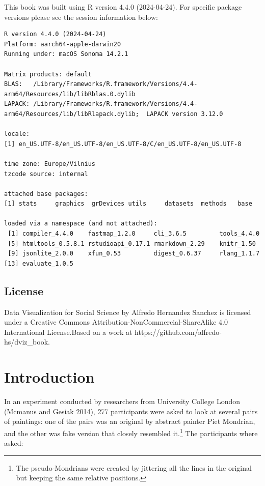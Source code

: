 \documentclass[
  letterpaper,
  DIV=11,
  numbers=noendperiod]{scrreprt}
\begin{document}

This book was built using R version 4.4.0 (2024-04-24). For specific
package versions please see the session information below:

\begin{verbatim}
R version 4.4.0 (2024-04-24)
Platform: aarch64-apple-darwin20
Running under: macOS Sonoma 14.2.1

Matrix products: default
BLAS:   /Library/Frameworks/R.framework/Versions/4.4-arm64/Resources/lib/libRblas.0.dylib 
LAPACK: /Library/Frameworks/R.framework/Versions/4.4-arm64/Resources/lib/libRlapack.dylib;  LAPACK version 3.12.0

locale:
[1] en_US.UTF-8/en_US.UTF-8/en_US.UTF-8/C/en_US.UTF-8/en_US.UTF-8

time zone: Europe/Vilnius
tzcode source: internal

attached base packages:
[1] stats     graphics  grDevices utils     datasets  methods   base     

loaded via a namespace (and not attached):
 [1] compiler_4.4.0    fastmap_1.2.0     cli_3.6.5         tools_4.4.0      
 [5] htmltools_0.5.8.1 rstudioapi_0.17.1 rmarkdown_2.29    knitr_1.50       
 [9] jsonlite_2.0.0    xfun_0.53         digest_0.6.37     rlang_1.1.7      
[13] evaluate_1.0.5   
\end{verbatim}

\section*{License}\label{license}


{Data Visualization for Social Science} by {Alfredo Hernandez Sanchez}
is licensed under a Creative Commons
Attribution-NonCommercial-ShareAlike 4.0 International License.Based on
a work at https://github.com/alfredo-hs/dviz\_book.


\chapter{Introduction}\label{introduction}

In an experiment conducted by researchers from University College London
(Mcmanus and Gesiak 2014), 277 participants were asked to look at
several pairs of paintings: one of the pairs was an original by abstract
painter Piet Mondrian, and the other was fake version that closely
resembled it.\footnote{The pseudo-Mondrians were created by jittering
  all the lines in the original but keeping the same relative positions.}
The participants where asked:
\end{document}
